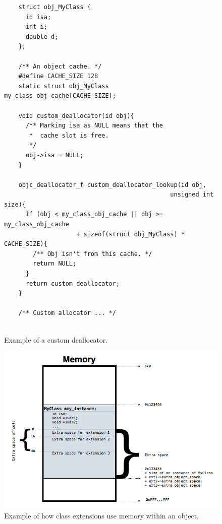 \begin{figure}[H] 
  \begin{verbatim}
    struct obj_MyClass {
      id isa;
      int i;
      double d;
    };
    
    /** An object cache. */
    #define CACHE_SIZE 128
    static struct obj_MyClass my_class_obj_cache[CACHE_SIZE];
    
    void custom_deallocator(id obj){
      /** Marking isa as NULL means that the
       *  cache slot is free.
       */
      obj->isa = NULL;
    }
    
    objc_deallocator_f custom_deallocator_lookup(id obj, 
                                              unsigned int size){
      if (obj < my_class_obj_cache || obj >= my_class_obj_cache 
                    + sizeof(struct obj_MyClass) * CACHE_SIZE){
        /** Obj isn't from this cache. */
        return NULL;
      }
      return custom_deallocator;
    }
    
    /** Custom allocator ... */
    
  \end{verbatim}
  \centering{}
  \caption{Example of a custom deallocator.}
  \label{fig:class_ext_dealloc_example}
\end{figure}

\begin{figure}[H] 
  
  \includegraphics[width=\textwidth]{img/class_extensions.png}
  
  \centering{}
  \caption{Example of how class extensions use memory within an object.}
  \label{fig:class_ext_mem_usage_img}
\end{figure}

